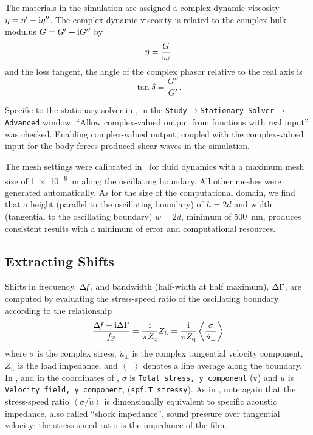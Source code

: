 The materials in the simulation are assigned a complex dynamic viscosity
$\eta = \eta'-{\mathrm{i}}\eta''$.  The complex dynamic viscosity is related to the complex bulk modulus
$G=G'+{\mathrm{i}} G''$ by
\begin{align}
  \eta = \frac{G}{{\mathrm{i}} \omega}
\end{align}
and the loss tangent, the angle of the complex phasor relative to the real axis is
\begin{equation}
  \tan \delta = \frac{G''}{G'}.
\end{equation}

Specific to the stationary solver in \comsol, in the
\texttt{Study$\rightarrow$Stationary Solver$\rightarrow$Advanced} window,
``Allow complex-valued output from functions with real input'' was checked.
Enabling complex-valued output, coupled with the complex-valued input for
the body forces produced shear waves in the simulation.

The mesh settings were calibrated in \comsol~for fluid dynamics with a
maximum mesh size of \SI{1e-9}{\meter} along the oscillating boundary.  All
other meshes were generated automatically.  As for the size of the
computational domain, we find that a height (parallel to the oscillating
boundary) of $h=2d$ and width (tangential to the oscillating boundary)
$w=2d$, minimum of \SI{500}{\nano\meter}, produces consistent results with a
minimum of error and computational resources.


\subsection{Extracting Shifts}
Shifts in frequency, $\Delta\!f$, and bandwidth (half-width at half maximum),
$\Delta\Gamma$, are computed by evaluating the stress-speed ratio of the oscillating
boundary according to the relationship
\begin{equation}
  \frac{\Delta\!f+{\mathrm{i}}\Delta\Gamma}{f_{\mathrm{F}}}=\frac{{\mathrm{i}}}{\pi
    Z_{\mathrm{q}}}Z_\mathrm{L} =\frac{{\mathrm{i}}}{\pi
    Z_{\mathrm{q}}}\left<\frac{\sigma}{\dot{u}_\perp}\right>
  \label{eqn:comsolextracttwo}
\end{equation}
where $\sigma$ is the complex stress, $\dot{u}_\perp$ is the complex
tangential velocity component, $Z_\mathrm{L}$ is the load impedance, and $\left<\enspace\right>$
denotes a line average along the boundary.  In \comsol, and in the
coordinates of , $\sigma$ is \texttt{Total stress,
  y component} (\texttt{v}) and $\dot{u}$ is \texttt{Velocity field, y
  component}, (\texttt{spf.T\_stressy}).  As in ,
note again that the stress-speed ratio $\left<\sigma/\dot{u}\right>$
is dimensionally equivalent to specific acoustic impedance, also called
``shock impedance'', sound pressure over tangential velocity; the
stress-speed ratio is the impedance of the film.

